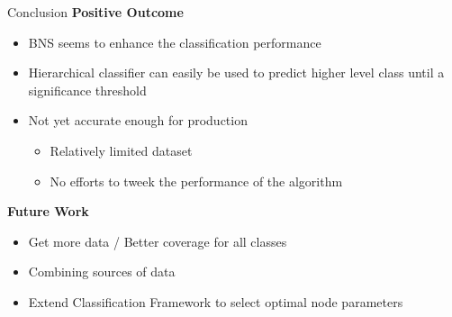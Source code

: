 
\begin{frame}[label=conclusion]{Conclusion}
	\textbf{Positive Outcome}
	
	\begin{itemize}
	\item BNS seems to enhance the classification performance
	\item Hierarchical classifier can easily be used to predict higher level class until a significance threshold
	\item Not yet accurate enough for production
	\begin{itemize}
		\item Relatively limited dataset
		\item No efforts to tweek the performance of the algorithm
	\end{itemize}
\end{itemize}
		
	\textbf{Future Work}
	
	\begin{itemize}
		
		\item Get more data / Better coverage for all classes
		\item Combining sources of data
		\item Extend Classification Framework to select optimal node parameters
		
	\end{itemize}
	
\end{frame}
